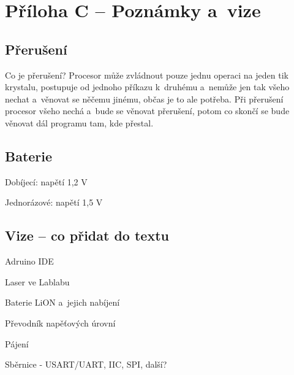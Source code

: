 \section*{Příloha C -- Poznámky a~vize}



\subsection*{Přerušení}

Co je přerušení? Procesor může zvládnout pouze jednu operaci na jeden tik krystalu, 
postupuje od jednoho příkazu k~druhému a~nemůže jen tak všeho nechat a~věnovat se něčemu jinému, občas je to ale potřeba.
 Při přerušení procesor všeho nechá a~bude se věnovat přerušení, potom co skončí se bude věnovat dál programu tam, kde přestal. 

\subsection*{Baterie}

Dobíjecí: napětí 1,2 V~

Jednorázové: napětí 1,5 V~
 

\subsection*{Vize -- co přidat do textu}

Adruino IDE 

Laser ve Lablabu 

Baterie LiON a~jejich nabíjení 

Převodník napěťových úrovní 

Pájení 

Sběrnice - USART/UART, IIC, SPI, další?






